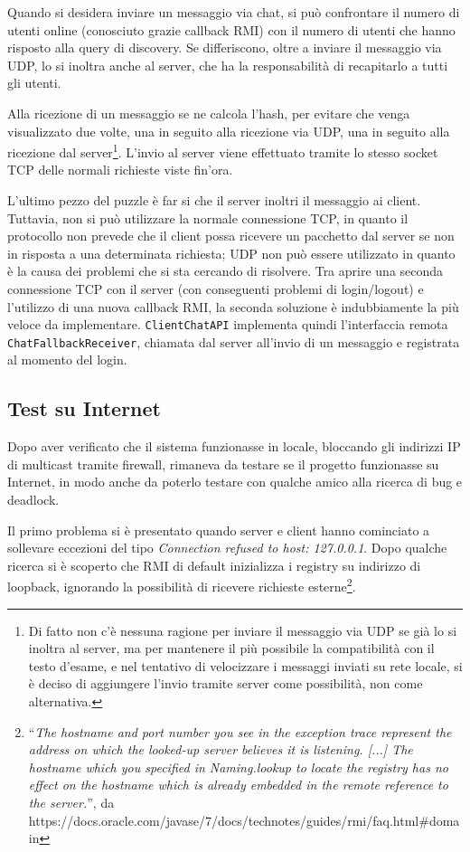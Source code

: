 \documentclass[a4paper,11pt] {article}
\begin{document}
Quando si desidera inviare un messaggio via chat, si può confrontare il numero di utenti online (conosciuto grazie callback RMI) con il numero di utenti che hanno risposto alla query di discovery. Se differiscono, oltre a inviare il messaggio via UDP, lo si inoltra anche al server, che ha la responsabilità di recapitarlo a tutti gli utenti.

Alla ricezione di un messaggio se ne calcola l'hash, per evitare che venga visualizzato due volte, una in seguito alla ricezione via UDP, una in seguito alla ricezione dal server\footnote{Di fatto non c'è nessuna ragione per inviare il messaggio via UDP se già lo si inoltra al server, ma per mantenere il più possibile la compatibilità con il testo d'esame, e nel tentativo di velocizzare i messaggi inviati su rete locale, si è deciso di aggiungere l'invio tramite server come possibilità, non come alternativa.}. L'invio al server viene effettuato tramite lo stesso socket TCP delle normali richieste viste fin'ora.

L'ultimo pezzo del puzzle è far si che il server inoltri il messaggio ai client. Tuttavia, non si può utilizzare la normale connessione TCP, in quanto il protocollo non prevede che il client possa ricevere un pacchetto dal server se non in risposta a una determinata richiesta; UDP non può essere utilizzato in quanto è la causa dei problemi che si sta cercando di risolvere. Tra aprire una seconda connessione TCP con il server (con conseguenti problemi di login/logout) e l'utilizzo di una nuova callback RMI, la seconda soluzione è indubbiamente la più veloce da implementare. \texttt{ClientChatAPI} implementa quindi l'interfaccia remota \texttt{ChatFallbackReceiver}, chiamata dal server all'invio di un messaggio e registrata al momento del login.

\subsection*{Test su Internet}

Dopo aver verificato che il sistema funzionasse in locale, bloccando gli indirizzi IP di multicast tramite firewall, rimaneva da testare se il progetto funzionasse su Internet, in modo anche da poterlo testare con qualche amico alla ricerca di bug e deadlock.

Il primo problema si è presentato quando server e client hanno cominciato a sollevare eccezioni del tipo \textit{Connection refused to host: 127.0.0.1}. Dopo qualche ricerca si è scoperto che RMI di default inizializza i registry su indirizzo di loopback, ignorando la possibilità di ricevere richieste esterne\footnote{``\textit{The hostname and port number you see in the exception trace represent the address on which the looked-up server believes it is listening. [...] The hostname which you specified in Naming.lookup to locate the registry has no effect on the hostname which is already embedded in the remote reference to the server.}'', da https://docs.oracle.com/javase/7/docs/technotes/guides/rmi/faq.html\#domain}.
\end{document}
